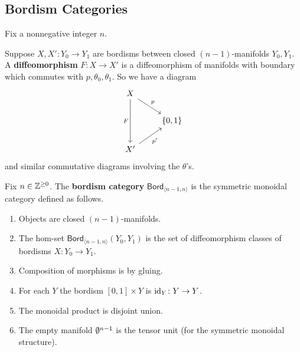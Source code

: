 \subsection{Bordism Categories} 
Fix a nonnegative integer $n$.
\begin{definition}[]
    Suppose $X,X' \colon Y_0 \to Y_1$ are bordisms between closed $(n-1)$-manifolds $Y_0,Y_1$. A \textbf{diffeomorphism} $F \colon X \to X'$ is a diffeomorphism of manifolds with boundary which commutes with $p,\theta_0, \theta_1$. So we have a diagram \[
    \begin{tikzcd}
X \arrow[dd, "F"'] \arrow[rd, "p"] &           \\
                                   & {\{0,1\}} \\
X' \arrow[ru, "p'"']               &          
\end{tikzcd}
    \]  and similar commutative diagrams involving the $\theta$'s.
\end{definition}
\begin{definition}[]
    Fix $n \in \mathbb{Z}^{\geq 0}$. The \textbf{bordism category} $\mathsf{Bord} _{\langle n-1,n \rangle }$ is the symmetric monoidal category defined as follows.
    \begin{enumerate}[label=(\roman*)]
    \setlength\itemsep{-.2em}
\item Objects are closed $(n-1)$-manifolds.
\item The hom-set $\mathsf{Bord} _{\langle n-1,n \rangle }(Y_0,Y_1)$ is the set of diffeomorphism classes of bordisms $X \colon Y_0 \to Y_1$.
\item Composition of  morphisms is by gluing.
\item For each $Y$ the bordism $[0,1] \times Y$ is $\operatorname{id}_Y \colon Y \to Y$.
\item The monoidal product is disjoint union.
\item The empty manifold $\emptyset ^{n-1}$ is the tensor unit (for the symmetric monoidal structure).
    
    \end{enumerate}
\end{definition}


